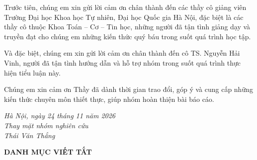 \documentclass[12pt,a4paper,openany,oneside]{report}
\theoremstyle{plain}
\numberwithin{equation}{section}
\begin{document}
Trước tiên, chúng em xin gửi lời cảm ơn chân thành đến các thầy cô giảng viên
Trường Đại học Khoa học Tự nhiên, Đại học Quốc gia Hà Nội, đặc biệt là các thầy
cô thuộc Khoa Toán -- Cơ -- Tin học, những người đã tận tình giảng dạy và truyền đạt
cho chúng em những kiến thức quý báu trong suốt quá trình học tập.

Và đặc biệt, chúng em xin gửi lời cảm ơn chân thành đến cô
{TS. Nguyễn Hải Vinh}, người đã tận tình hướng dẫn và hỗ trợ
nhóm trong suốt quá trình thực hiện tiểu luận này.

Chúng em xin cảm ơn Thầy đã dành thời gian
trao đổi, góp ý và cung cấp những kiến thức chuyên môn thiết thực, giúp nhóm
hoàn thiện bài báo cáo.

\vspace{0.3cm}
\begin{flushright}
\textit{Hà Nội, ngày 24 tháng 11 năm 2026}\\
\textit{Thay mặt nhóm nghiên cứu}\\[0.2cm]
\textit{Thái Văn Thắng}
\end{flushright}
\newpage

\tableofcontents
\newpage

\listoffigures
\newpage

\listoftables
\newpage

\newpage

\begin{center}
    \LARGE{\textbf{DANH MỤC VIẾT TẮT}}
\end{center}

\vspace{1cm}

\renewcommand{\arraystretch}{1.8} %
\end{document}
